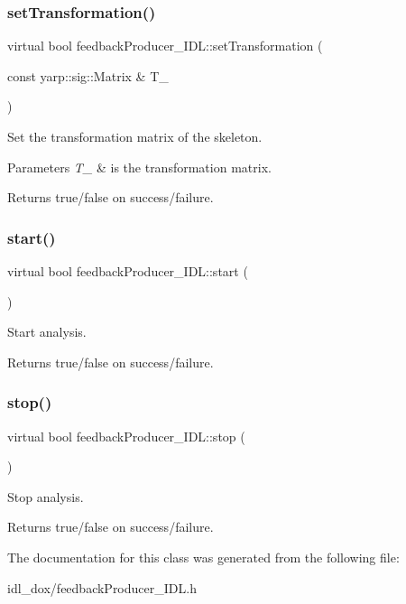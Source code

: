 \subsubsection{\texorpdfstring{setTransformation()}{setTransformation()}}
{\footnotesize\ttfamily virtual bool feedback\+Producer\+\_\+\+I\+D\+L\+::set\+Transformation (\begin{DoxyParamCaption}\item[{const yarp\+::sig\+::\+Matrix \&}]{T\+\_\+ }\end{DoxyParamCaption})\hspace{0.3cm}{\ttfamily [virtual]}}



Set the transformation matrix of the skeleton. 


\begin{DoxyParams}{Parameters}
{\em T\+\_\+} & is the transformation matrix. \\
\hline
\end{DoxyParams}
\begin{DoxyReturn}{Returns}
true/false on success/failure. 
\end{DoxyReturn}
\mbox{\label{classfeedbackProducer__IDL_a50c492862766e36f730439a3a8f0d910}} 
\subsubsection{\texorpdfstring{start()}{start()}}
{\footnotesize\ttfamily virtual bool feedback\+Producer\+\_\+\+I\+D\+L\+::start (\begin{DoxyParamCaption}{ }\end{DoxyParamCaption})\hspace{0.3cm}{\ttfamily [virtual]}}



Start analysis. 

\begin{DoxyReturn}{Returns}
true/false on success/failure. 
\end{DoxyReturn}
\mbox{\label{classfeedbackProducer__IDL_afdfffd0edb784e0a9906ed33e164027b}} 
\subsubsection{\texorpdfstring{stop()}{stop()}}
{\footnotesize\ttfamily virtual bool feedback\+Producer\+\_\+\+I\+D\+L\+::stop (\begin{DoxyParamCaption}{ }\end{DoxyParamCaption})\hspace{0.3cm}{\ttfamily [virtual]}}



Stop analysis. 

\begin{DoxyReturn}{Returns}
true/false on success/failure. 
\end{DoxyReturn}


The documentation for this class was generated from the following file\+:\begin{DoxyCompactItemize}
\item 
idl\+\_\+dox/feedback\+Producer\+\_\+\+I\+D\+L.\+h\end{DoxyCompactItemize}
